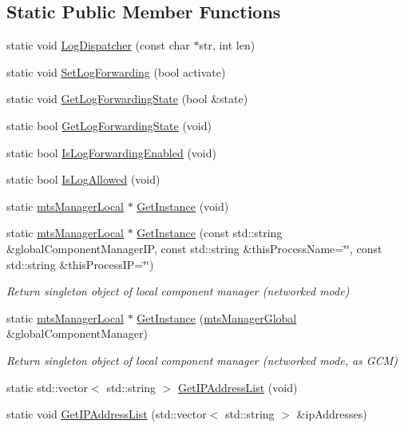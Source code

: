 \subsection*{Static Public Member Functions}
\begin{DoxyCompactItemize}
\item 
static void \hyperlink{classmts_manager_local_aa5d9ccfbe55e23838a39dae4d707301b}{Log\+Dispatcher} (const char $\ast$str, int len)
\item 
static void \hyperlink{classmts_manager_local_a77e6f7ca43375b8af362ea43db802c4b}{Set\+Log\+Forwarding} (bool activate)
\item 
static void \hyperlink{classmts_manager_local_ab46bcc3be5e9fd56b737671147173729}{Get\+Log\+Forwarding\+State} (bool \&state)
\item 
static bool \hyperlink{classmts_manager_local_a6c96baf1f124ab0fe98ae6e8482c0c4c}{Get\+Log\+Forwarding\+State} (void)
\item 
static bool \hyperlink{classmts_manager_local_a7506b986c61d60bf2e35d80ac76eef64}{Is\+Log\+Forwarding\+Enabled} (void)
\item 
static bool \hyperlink{classmts_manager_local_a52c0b11e6ba9331c076bd4c1c75462c6}{Is\+Log\+Allowed} (void)
\item 
static \hyperlink{classmts_manager_local}{mts\+Manager\+Local} $\ast$ \hyperlink{classmts_manager_local_a025cb3746e1e69b07723066b562ac5cd}{Get\+Instance} (void)
\item 
static \hyperlink{classmts_manager_local}{mts\+Manager\+Local} $\ast$ \hyperlink{classmts_manager_local_a9b41b6aa95fa8d557bb22f9bc40ac127}{Get\+Instance} (const std\+::string \&global\+Component\+Manager\+I\+P, const std\+::string \&this\+Process\+Name=\char`\"{}\char`\"{}, const std\+::string \&this\+Process\+I\+P=\char`\"{}\char`\"{})
\begin{DoxyCompactList}\small\item\em Return singleton object of local component manager (networked mode) \end{DoxyCompactList}\item 
static \hyperlink{classmts_manager_local}{mts\+Manager\+Local} $\ast$ \hyperlink{classmts_manager_local_a50daf201befe4d930344730cb0d9a2e1}{Get\+Instance} (\hyperlink{classmts_manager_global}{mts\+Manager\+Global} \&global\+Component\+Manager)
\begin{DoxyCompactList}\small\item\em Return singleton object of local component manager (networked mode, as G\+C\+M) \end{DoxyCompactList}\item 
static std\+::vector$<$ std\+::string $>$ \hyperlink{classmts_manager_local_a50b47a2ab03e49e5b63a7c2a3bc75ed2}{Get\+I\+P\+Address\+List} (void)
\item 
static void \hyperlink{classmts_manager_local_a21bb40e91c1db5cbb31b0dad3de1e10f}{Get\+I\+P\+Address\+List} (std\+::vector$<$ std\+::string $>$ \&ip\+Addresses)
\end{DoxyCompactItemize}
